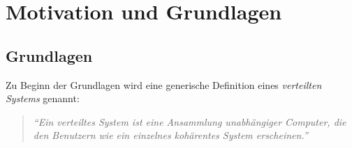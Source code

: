 \chapter{Motivation und Grundlagen}

\section{Grundlagen}
\label{grundlagen}
Zu Beginn der Grundlagen wird eine generische Definition eines \emph{verteilten Systems} genannt:
\begin{quotation}
	\textit{\enquote{Ein verteiltes System ist eine Ansammlung unabhängiger Computer, die den Benutzern wie ein einzelnes kohärentes System erscheinen.}} \citep{tanenbaum}
\end{quotation}




